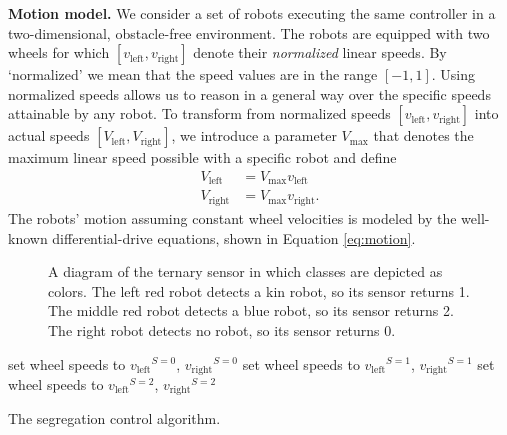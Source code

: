 \documentclass[letterpaper, 10 pt, conference]{ieeeconf}
\newcommand{\myparagraph}[1]{\textbf{#1.}}
\begin{document}
\newcommand{\vL}{\ensuremath{v_{\text{left}}}}
\newcommand{\vR}{\ensuremath{v_{\text{right}}}}
\newcommand{\vaL}{\ensuremath{V_{\text{left}}}}
\newcommand{\vaR}{\ensuremath{V_{\text{right}}}}
\newcommand{\VM}{\ensuremath{V_{\text{max}}}}
\myparagraph{Motion model}
We consider a set of robots executing the same controller in a two-dimensional,
obstacle-free environment. The robots are equipped with two wheels for which
$[\vL,\vR]$ denote their \emph{normalized} linear speeds. By `normalized' we
mean that the speed values are in the range $[-1, 1]$. Using normalized speeds
allows us to reason in a general way over the specific speeds attainable by any
robot. To transform from normalized speeds $[\vL,\vR]$ into actual speeds
$[\vaL,\vaR]$, we introduce a parameter $\VM$ that denotes the maximum linear
speed possible with a specific robot and define
\begin{align}
  \vaL &= \VM \vL\\
  \vaR &= \VM \vR.
\end{align}
The robots' motion assuming constant wheel velocities is modeled by the well-known differential-drive
equations, shown in Equation \eqref{eq:motion}.

\newcommand{\vPN}[2]{\ensuremath{v_{\text{#1}}}^{S=#2}}
\newcommand{\robot}[2]{%
  \filldraw[draw=#2,fill=#2!20] (#1) circle(5mm);
  \draw[draw=#2,->,-Stealth,rotate around={0:(#1)}] (#1) -- +(5mm,0);
  \fill[fill=gray!20] ($(#1)+(5mm,0)$) -- +( 45:1cm) -- +(-45:1cm) -- cycle;%
  \fill[fill=#2] ($(#1)+(5mm,0)$) circle (1mm);%
}
\begin{figure}[t]
  \centering
  \caption{A diagram of the ternary sensor in which classes are depicted
  as colors. The left red robot detects a kin robot, so its sensor
  returns 1. The middle red robot detects a blue robot, so its sensor
  returns 2. The right robot detects no robot, so its sensor returns
  0.}
  \label{fig:sensor}
\end{figure}

\begin{algorithm}[t]
  \begin{algorithmic}
     \State set wheel speeds to $\vPN{left}{0}$, $\vPN{right}{0}$
     \State set wheel speeds to $\vPN{left}{1}$, $\vPN{right}{1}$
    \Else \State set wheel speeds to $\vPN{left}{2}$, $\vPN{right}{2}$
    \EndIf
  \end{algorithmic}
  \caption{The segregation control algorithm.}
  \label{alg:controller}
\end{algorithm}
\end{document}

